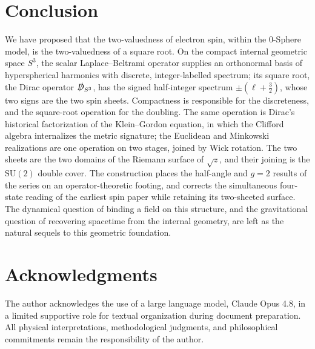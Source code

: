 \documentclass[%
 reprint, amsmath,amssymb, aps, prb, ]{revtex4-2}
\numberwithin{equation}{section}
\newcommand{\Dslash}{\slashed{D}}
\begin{document}
\section{Conclusion}
\label{sec:conclusion}

We have proposed that the two-valuedness of electron spin, within the 0-Sphere model, is the two-valuedness of a square root. On the compact internal geometric space $S^{3}$, the scalar Laplace--Beltrami operator supplies an orthonormal basis of hyperspherical harmonics with discrete, integer-labelled spectrum; its square root, the Dirac operator $\Dslash_{S^{3}}$, has the signed half-integer spectrum $\pm(\ell+\tfrac32)$, whose two signs are the two spin sheets. Compactness is responsible for the discreteness, and the square-root operation for the doubling. The same operation is Dirac's historical factorization of the Klein--Gordon equation, in which the Clifford algebra internalizes the metric signature; the Euclidean and Minkowski realizations are one operation on two stages, joined by Wick rotation. The two sheets are the two domains of the Riemann surface of $\sqrt{z}$, and their joining is the $\mathrm{SU}(2)$ double cover. The construction places the half-angle and $g=2$ results of the series on an operator-theoretic footing, and corrects the simultaneous four-state reading of the earliest spin paper while retaining its two-sheeted surface. The dynamical question of binding a field on this structure, and the gravitational question of recovering spacetime from the internal geometry, are left as the natural sequels to this geometric foundation.

\section*{Acknowledgments}

The author acknowledges the use of a large language model, Claude Opus 4.8, in a limited supportive role for textual organization during document preparation. All physical interpretations, methodological judgments, and philosophical commitments remain the responsibility of the author.

\appendix

\end{document}
